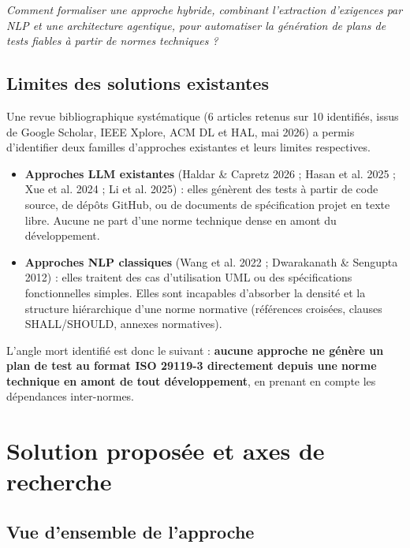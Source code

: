 \documentclass[12pt, a4paper]{article}
\begin{document}
\begin{infobox}
\textit{Comment formaliser une approche hybride, combinant l'extraction d'exigences par
NLP et une architecture agentique, pour automatiser la génération de plans de tests
fiables à partir de normes techniques ?}
\end{infobox}

\subsection{Limites des solutions existantes}

Une revue bibliographique systématique (6 articles retenus sur 10 identifiés, issus de
Google Scholar, IEEE Xplore, ACM DL et HAL, mai 2026) a permis d'identifier deux familles
d'approches existantes et leurs limites respectives.

\begin{itemize}
  \item \textbf{Approches LLM existantes} (Haldar \& Capretz 2026 ; Hasan et al. 2025 ;
    Xue et al. 2024 ; Li et al. 2025) : elles génèrent des tests à partir de code source,
    de dépôts GitHub, ou de documents de spécification projet en texte libre. Aucune ne
    part d'une norme technique dense en amont du développement.

  \item \textbf{Approches NLP classiques} (Wang et al. 2022 ; Dwarakanath \& Sengupta
    2012) : elles traitent des cas d'utilisation UML ou des spécifications fonctionnelles
    simples. Elles sont incapables d'absorber la densité et la structure hiérarchique
    d'une norme normative (références croisées, clauses SHALL/SHOULD, annexes normatives).
\end{itemize}

L'angle mort identifié est donc le suivant : \textbf{aucune approche ne génère
un plan de test au format ISO 29119-3 directement depuis une norme technique en amont
de tout développement}, en prenant en compte les dépendances inter-normes.

\section{Solution proposée et axes de recherche}

\subsection{Vue d'ensemble de l'approche}
\end{document}
